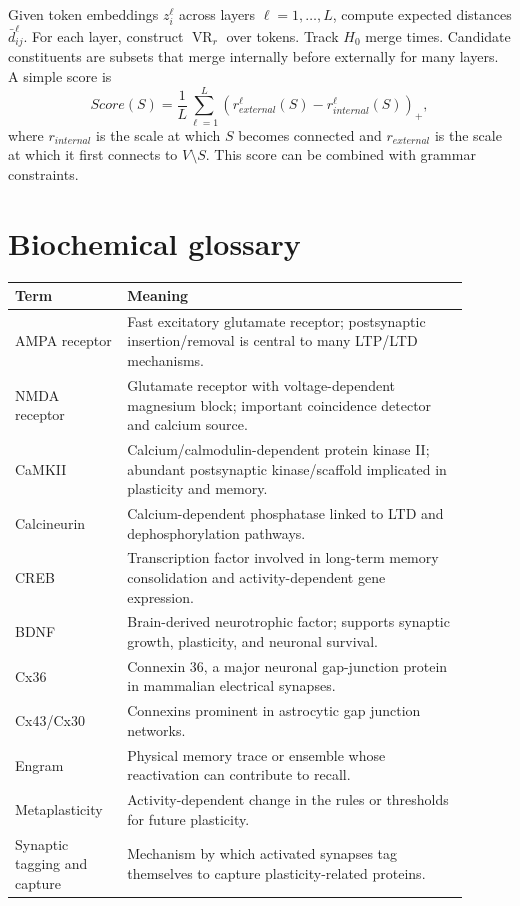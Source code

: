 \documentclass[11pt]{article}
\newcommand{\VR}{\operatorname{VR}}
\newcommand{\1}{\mathbf{1}}
\begin{document}
Given token embeddings $z_i^\ell$ across layers $\ell=1,\ldots,L$, compute expected distances $\bar d_{ij}^\ell$. For each layer, construct $\VR_r$ over tokens. Track $H_0$ merge times. Candidate constituents are subsets that merge internally before externally for many layers. A simple score is
\[
Score(S)=\frac1L\sum_{\ell=1}^L\left(r_{external}^\ell(S)-r_{internal}^\ell(S)\right)_+,
\]
where $r_{internal}$ is the scale at which $S$ becomes connected and $r_{external}$ is the scale at which it first connects to $V\setminus S$. This score can be combined with grammar constraints.

\section{Biochemical glossary}

\begin{longtable}{p{0.22\linewidth}p{0.68\linewidth}}
\toprule
Term & Meaning \\
\midrule
AMPA receptor & Fast excitatory glutamate receptor; postsynaptic insertion/removal is central to many LTP/LTD mechanisms. \\
NMDA receptor & Glutamate receptor with voltage-dependent magnesium block; important coincidence detector and calcium source. \\
CaMKII & Calcium/calmodulin-dependent protein kinase II; abundant postsynaptic kinase/scaffold implicated in plasticity and memory. \\
Calcineurin & Calcium-dependent phosphatase linked to LTD and dephosphorylation pathways. \\
CREB & Transcription factor involved in long-term memory consolidation and activity-dependent gene expression. \\
BDNF & Brain-derived neurotrophic factor; supports synaptic growth, plasticity, and neuronal survival. \\
Cx36 & Connexin 36, a major neuronal gap-junction protein in mammalian electrical synapses. \\
Cx43/Cx30 & Connexins prominent in astrocytic gap junction networks. \\
Engram & Physical memory trace or ensemble whose reactivation can contribute to recall. \\
Metaplasticity & Activity-dependent change in the rules or thresholds for future plasticity. \\
Synaptic tagging and capture & Mechanism by which activated synapses tag themselves to capture plasticity-related proteins. \\
\bottomrule
\end{longtable}
\end{document}
